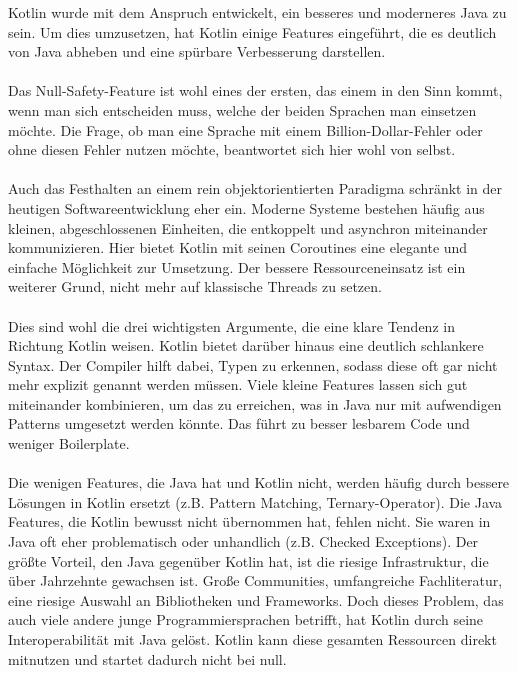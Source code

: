 \documentclass[11pt]{article}
\begin{document}
    Kotlin wurde mit dem Anspruch entwickelt, ein besseres und moderneres Java zu sein.
    Um dies umzusetzen, hat Kotlin einige Features eingeführt, die es deutlich von Java abheben und eine spürbare Verbesserung darstellen.\\
    \\
    Das Null-Safety-Feature ist wohl eines der ersten, das einem in den Sinn kommt, wenn man sich entscheiden muss, welche der beiden Sprachen man einsetzen möchte.
    Die Frage, ob man eine Sprache mit einem Billion-Dollar-Fehler oder ohne diesen Fehler nutzen möchte, beantwortet sich hier wohl von selbst.\\
    \\
    Auch das Festhalten an einem rein objektorientierten Paradigma schränkt in der heutigen Softwareentwicklung eher ein.
    Moderne Systeme bestehen häufig aus kleinen, abgeschlossenen Einheiten, die entkoppelt und asynchron miteinander kommunizieren.
    Hier bietet Kotlin mit seinen Coroutines eine elegante und einfache Möglichkeit zur Umsetzung.
    Der bessere Ressourceneinsatz ist ein weiterer Grund, nicht mehr auf klassische Threads zu setzen.\\
    \\
    Dies sind wohl die drei wichtigsten Argumente, die eine klare Tendenz in Richtung Kotlin weisen.
    Kotlin bietet darüber hinaus eine deutlich schlankere Syntax.
    Der Compiler hilft dabei, Typen zu erkennen, sodass diese oft gar nicht mehr explizit genannt werden müssen.
    Viele kleine Features lassen sich gut miteinander kombinieren, um das zu erreichen, was in Java nur mit aufwendigen Patterns umgesetzt werden könnte.
    Das führt zu besser lesbarem Code und weniger Boilerplate.\\
    \\
    Die wenigen Features, die Java hat und Kotlin nicht, werden häufig durch bessere Lösungen in Kotlin ersetzt (z.B. Pattern Matching, Ternary-Operator).
    Die Java Features, die Kotlin bewusst nicht übernommen hat, fehlen nicht.
    Sie waren in Java oft eher problematisch oder unhandlich (z.B. Checked Exceptions).
    Der größte Vorteil, den Java gegenüber Kotlin hat, ist die riesige Infrastruktur, die über Jahrzehnte gewachsen ist.
    Große Communities, umfangreiche Fachliteratur, eine riesige Auswahl an Bibliotheken und Frameworks.
    Doch dieses Problem, das auch viele andere junge Programmiersprachen betrifft, hat Kotlin durch seine Interoperabilität mit Java gelöst.
    Kotlin kann diese gesamten Ressourcen direkt mitnutzen und startet dadurch nicht bei null.\\
\end{document}
